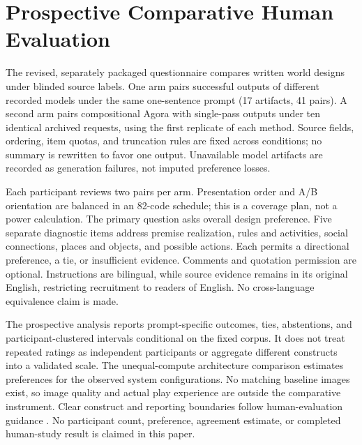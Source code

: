 \section{Prospective Comparative Human Evaluation}
\label{app:human}
The revised, separately packaged questionnaire compares written world designs
under blinded source labels. One arm pairs successful outputs of different
recorded models under the same one-sentence prompt (17 artifacts, 41 pairs).
A second arm pairs compositional Agora with single-pass outputs under ten
identical archived requests, using the first replicate of each method.
Source fields, ordering, item quotas, and truncation rules are fixed across
conditions; no summary is rewritten to favor one output. Unavailable model
artifacts are recorded as generation failures, not imputed preference losses.

Each participant reviews two pairs per arm. Presentation order and A/B
orientation are balanced in an 82-code schedule; this is a coverage plan,
not a power calculation. The primary question asks overall design preference.
Five separate diagnostic items address premise realization, rules and
activities, social connections, places and objects, and possible actions.
Each permits a directional preference, a tie, or insufficient evidence.
Comments and quotation permission are optional. Instructions are bilingual,
while source evidence remains in its original English, restricting recruitment
to readers of English. No cross-language equivalence claim is made.

The prospective analysis reports prompt-specific outcomes, ties, abstentions,
and participant-clustered intervals conditional on the fixed corpus. It does
not treat repeated ratings as independent participants or aggregate different
constructs into a validated scale. The unequal-compute architecture comparison
estimates preferences for the observed system configurations. No matching
baseline images exist, so image quality and actual play experience are outside
the comparative instrument. Clear construct and reporting boundaries follow
human-evaluation guidance \cite{howcroft}. No participant count, preference,
agreement estimate, or completed human-study result is claimed in this paper.
